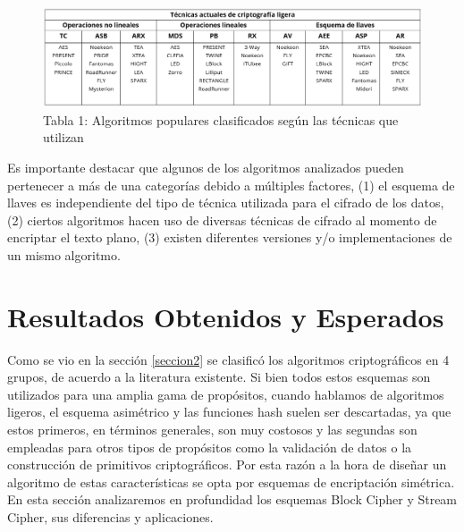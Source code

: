 \documentclass[a4paper,10pt]{article}
\begin{document}
	\begin{figure}[h]
		\centering
		\includegraphics[width=1.0\textwidth]{tablaAlgoritmosCriptografiaLigera.PNG}
		\caption{Tabla 1: Algoritmos populares clasificados según las técnicas que utilizan}
		\label{algoritmosCriptografiaLigera}
	\end{figure}
	Es importante destacar que algunos de los algoritmos analizados pueden pertenecer a más de una categorías debido a múltiples factores, (1) el esquema de llaves es independiente del tipo de técnica utilizada para el cifrado de los datos, (2) ciertos algoritmos hacen uso de diversas técnicas de cifrado al momento de encriptar el texto plano, (3) existen diferentes versiones y/o implementaciones de un mismo algoritmo.
	\section{Resultados Obtenidos y Esperados}
	\label{seccion3}
	Como se vio en la sección \ref{seccion2} se clasificó los algoritmos criptográficos en 4 grupos, de acuerdo a la literatura existente. Si bien todos estos esquemas son utilizados para una amplia gama de propósitos, cuando hablamos de algoritmos ligeros, el esquema asimétrico y las funciones hash suelen ser descartadas, ya que estos primeros, en términos generales, son muy costosos y las segundas son empleadas para otros tipos de propósitos como la validación de datos o la construcción de primitivos criptográficos. Por esta razón a la hora de diseñar un algoritmo de estas características se opta por esquemas de encriptación simétrica. En esta sección analizaremos en profundidad los esquemas Block Cipher y Stream Cipher, sus diferencias y aplicaciones.
\end{document}
